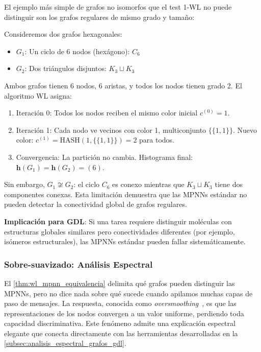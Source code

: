 \begin{example}\label{ex:grafos_wl_indistinguibles}
El ejemplo más simple de grafos no isomorfos que el test 1-WL no puede distinguir son los grafos regulares de mismo grado y tamaño:

Consideremos dos grafos hexagonales:
\begin{itemize}
    \item $G_1$: Un ciclo de 6 nodos (hexágono): $C_6$
    \item $G_2$: Dos triángulos disjuntos: $K_3 \sqcup K_3$
\end{itemize}

Ambos grafos tienen 6 nodos, 6 aristas, y todos los nodos tienen grado 2. El algoritmo WL asigna:
\begin{enumerate}
    \item Iteración 0: Todos los nodos reciben el mismo color inicial $c^{(0)} = 1$.
    \item Iteración 1: Cada nodo ve vecinos con color 1, multiconjunto $\{\{1, 1\}\}$. Nuevo color: $c^{(1)} = \mathrm{HASH}(1, \{\{1,1\}\}) = 2$ para todos.
    \item Convergencia: La partición no cambia. Histograma final: $\mathbf{h}(G_1) = \mathbf{h}(G_2) = (6)$.
\end{enumerate}

Sin embargo, $G_1 \not\cong G_2$: el ciclo $C_6$ es conexo mientras que $K_3 \sqcup K_3$ tiene dos componentes conexas. Esta limitación demuestra que las \glspl{MPNN} estándar no pueden detectar la conectividad global de grafos regulares.

\textbf{Implicación para GDL}: Si una tarea requiere distinguir moléculas con estructuras globales similares pero conectividades diferentes (por ejemplo, isómeros estructurales), las \glspl{MPNN} estándar pueden fallar sistemáticamente.
\end{example}

\subsubsection{Sobre-suavizado: Análisis Espectral}\label{subsubsec:oversmoothing}

El \autoref{thm:wl_mpnn_equivalencia} delimita qué grafos pueden distinguir las \glspl{MPNN}, pero no dice nada sobre qué sucede cuando apilamos muchas capas de paso de mensajes. La respuesta, conocida como \textit{\gls{oversmoothing}}~\citep{li2018deeper}, es que las representaciones de los nodos convergen a un valor uniforme, perdiendo toda capacidad discriminativa. Este fenómeno admite una explicación espectral elegante que conecta directamente con las herramientas desarrolladas en la \autoref{subsec:analisis_espectral_grafos_gdl}.

